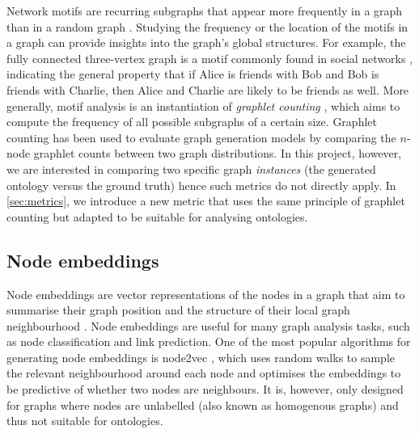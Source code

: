 Network motifs are recurring subgraphs that appear more frequently in a graph than in a random graph \cite{milo2002network}. Studying the frequency or the location of the motifs in a graph can provide insights into the graph's global structures. For example, the fully connected three-vertex graph is a motif commonly found in social networks \cite{stone2019network}, indicating the general property that if Alice is friends with Bob and Bob is friends with Charlie, then Alice and Charlie are likely to be friends as well. More generally, motif analysis is an instantiation of \emph{graphlet counting} \cite{ribeiro2021survey}, which aims to compute the frequency of all possible subgraphs of a certain size. Graphlet counting has been used to evaluate graph generation models \cite{you2018graphrnn} by comparing the $n$-node graphlet counts between two graph distributions. In this project, however, we are interested in comparing two specific graph \emph{instances} (the generated ontology versus the ground truth) hence such metrics do not directly apply. In \cref{sec:metrics}, we introduce a new metric that uses the same principle of graphlet counting but adapted to be suitable for analysing ontologies.

\subsection{Node embeddings}  \label{sec:node-embeddings}

Node embeddings are vector representations of the nodes in a graph that aim to summarise their graph position and the structure of their local graph neighbourhood \cite{hamilton2020graph}. Node embeddings are useful for many graph analysis tasks, such as node classification and link prediction. One of the most popular algorithms for generating node embeddings is node2vec \cite{grover2016node2vec}, which uses random walks to sample the relevant neighbourhood around each node and optimises the embeddings to be predictive of whether two nodes are neighbours. It is, however, only designed for graphs where nodes are unlabelled (also known as homogenous graphs) and thus not suitable for ontologies.

